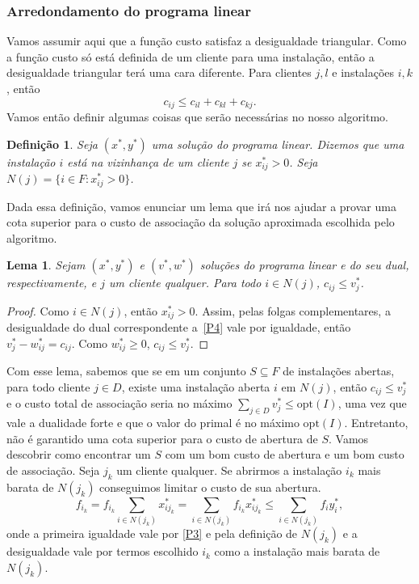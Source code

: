 \documentclass[12pt]{article}
\newcommand{\opt}{\ensuremath{\mathrm{opt}}}
\newtheorem{lemma}[theorem]{Lema}
\newtheorem{definition}[theorem]{Definição}
\begin{document}
\subsubsection{Arredondamento do programa linear}
Vamos assumir aqui que a função custo satisfaz a desigualdade triangular. Como a função custo só está definida de um cliente para uma instalação, então a desigualdade triangular terá uma cara diferente. Para clientes $j,l$ e  instalações $i,k$, então
\[c_{ij} \leq c_{il} + c_{kl} + c_{kj}.\]
Vamos então definir algumas coisas que serão necessárias no nosso algoritmo.
\begin{definition}
    Seja $(x^*,y^*)$ uma solução do programa linear. Dizemos que uma instalação $i$ está na \emph{vizinhança} de um cliente $j$ se $x^*_{ij} > 0$. Seja $N(j) = \{ i \in F : x^*_{ij} > 0\}$.
\end{definition}
Dada essa definição, vamos enunciar um lema que irá nos ajudar a provar uma cota superior para o custo de associação da solução aproximada escolhida pelo algoritmo.
\begin{lemma}\label{lemma:3.5}
    Sejam $(x^*,y^*)$ e $(v^*,w^*)$ soluções do programa linear e do seu dual, respectivamente, e $j$ um cliente qualquer. Para todo $i \in N(j)$, $c_{ij} \leq v^*_j$.
\end{lemma}
\begin{proof}
    Como $i \in N(j)$, então $x^*_{ij}>0$. Assim, pelas folgas complementares, a desigualdade do dual correspondente a~\ref{P4} vale por igualdade, então $v^*_j - w^*_{ij} = c_{ij}$. Como $w^*_{ij} \geq 0$, $c_{ij} \leq v^*_j$. 
\end{proof}
Com esse lema, sabemos que se em um conjunto $S \subseteq F$ de instalações abertas, para todo cliente $j \in D$, existe uma instalação aberta $i$ em $N(j)$, então $c_{ij}\leq v_j^*$ e o custo total de associação seria no máximo $\sum_{j\in D}v_j^* \leq \opt(I)$, uma vez que vale a dualidade forte e que o valor do primal é no máximo $\opt(I)$. Entretanto, não é garantido uma cota superior para o custo de abertura de $S$. Vamos descobrir como encontrar um $S$ com um bom custo de abertura e um bom custo de associação. Seja $j_k$ um cliente qualquer. Se abrirmos a instalação $i_k$ mais barata de $N(j_k)$ conseguimos limitar o custo de sua abertura.
\[\tag{*} \label{relx_fl:*}
    f_{i_k} = f_{i_k} \sum_{i \in N(j_k)}x^*_{ij_k} = \sum_{i \in N(j_k)}f_{i_k}x^*_{ij_k} \leq \sum_{i \in N(j_k)}f_{i}y^*_{i},
\]
onde a primeira igualdade vale por \ref{P3} e pela definição de $N(j_k)$ e a desigualdade vale por termos escolhido $i_k$ como a instalação mais barata de $N(j_k)$.
\end{document}
